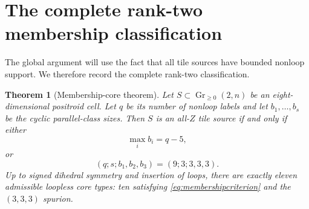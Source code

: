 \documentclass[11pt]{article}
\newtheorem{theorem}{Theorem}[section]
\newcommand{\Gr}{\operatorname{Gr}}
\newcommand{\1}{\mathbf 1}
\begin{document}
\section{The complete rank-two membership classification}
\label{sec:membership}

The global argument will use the fact that all tile sources have bounded
nonloop support.  We therefore record the complete rank-two classification.

\begin{theorem}[Membership-core theorem]\label{thm:membership}
Let $S\subset\Gr_{\ge0}(2,n)$ be an eight-dimensional positroid cell.  Let
$q$ be its number of nonloop labels and let
$b_1,\dots,b_s$ be the cyclic parallel-class sizes.  Then $S$ is an
all-$Z$ tile source if and only if either
\begin{equation}\label{eq:membershipcriterion}
\max_i b_i=q-5,
\end{equation}
or
\[
(q;s;b_1,b_2,b_3)=(9;3;3,3,3).
\]
Up to signed dihedral symmetry and insertion of loops, there are exactly
eleven admissible loopless core types: ten satisfying
\eqref{eq:membershipcriterion} and the $(3,3,3)$ spurion.
\end{theorem}
\end{document}
